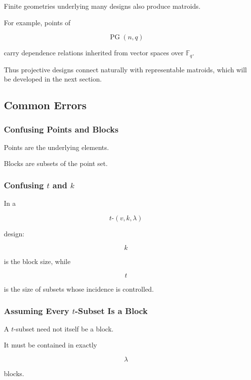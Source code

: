 Finite geometries underlying many designs also produce matroids.

For example, points of

\[
\operatorname{PG}(n,q)
\]

carry dependence relations inherited from vector spaces over
\(\mathbb{F}_q\).

Thus projective designs connect naturally with representable matroids,
which will be developed in the next section.

\subsection{Common Errors}
\label{subsec:design-theory-common-errors}

\subsubsection{Confusing Points and Blocks}

Points are the underlying elements.

Blocks are subsets of the point set.

\subsubsection{Confusing \(t\) and \(k\)}

In a

\[
t\text{-}(v,k,\lambda)
\]

design:

\[
k
\]

is the block size, while

\[
t
\]

is the size of subsets whose incidence is controlled.

\subsubsection{Assuming Every \(t\)-Subset Is a Block}

A \(t\)-subset need not itself be a block.

It must be contained in exactly

\[
\lambda
\]

blocks.

